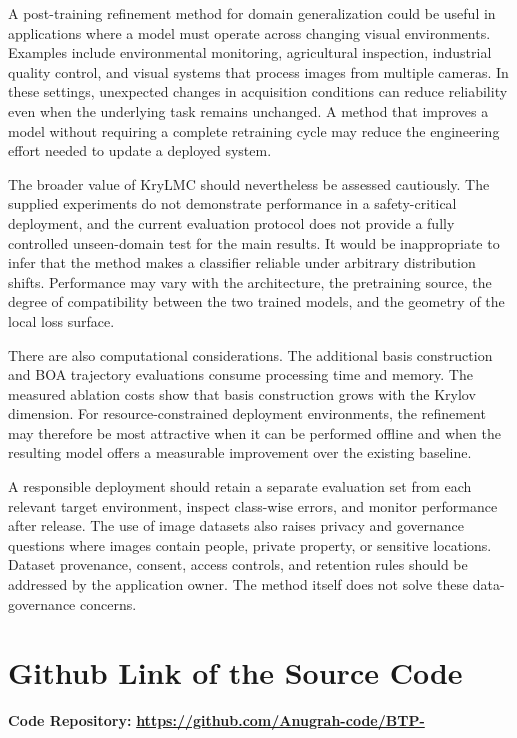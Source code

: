 \documentclass[11pt,a4paper]{article}
\begin{document}
A post-training refinement method for domain generalization could be useful in applications where a model must operate across changing visual environments. Examples include environmental monitoring, agricultural inspection, industrial quality control, and visual systems that process images from multiple cameras. In these settings, unexpected changes in acquisition conditions can reduce reliability even when the underlying task remains unchanged. A method that improves a model without requiring a complete retraining cycle may reduce the engineering effort needed to update a deployed system.

The broader value of KryLMC should nevertheless be assessed cautiously. The supplied experiments do not demonstrate performance in a safety-critical deployment, and the current evaluation protocol does not provide a fully controlled unseen-domain test for the main results. It would be inappropriate to infer that the method makes a classifier reliable under arbitrary distribution shifts. Performance may vary with the architecture, the pretraining source, the degree of compatibility between the two trained models, and the geometry of the local loss surface.

There are also computational considerations. The additional basis construction and BOA trajectory evaluations consume processing time and memory. The measured ablation costs show that basis construction grows with the Krylov dimension. For resource-constrained deployment environments, the refinement may therefore be most attractive when it can be performed offline and when the resulting model offers a measurable improvement over the existing baseline.

A responsible deployment should retain a separate evaluation set from each relevant target environment, inspect class-wise errors, and monitor performance after release. The use of image datasets also raises privacy and governance questions where images contain people, private property, or sensitive locations. Dataset provenance, consent, access controls, and retention rules should be addressed by the application owner. The method itself does not solve these data-governance concerns.

\section{Github Link of the Source Code}

\textbf{Code Repository:} 
\href{https://github.com/Anugrah-code/BTP-}{\textbf{https://github.com/Anugrah-code/BTP-}}
\end{document}
